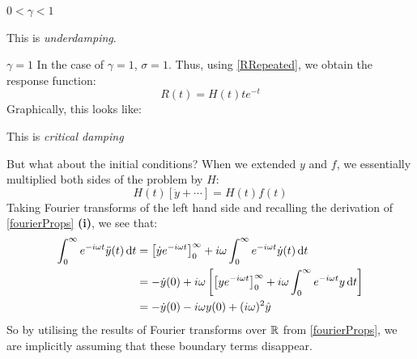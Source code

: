 \documentclass[../main.tex]{subfiles}
\begin{document}
\begin{example}
\begin{proofcases}
\begin{case}{$0 < \gamma < 1$}
\begin{center}
      \end{center}
      This is \textit{underdamping}.
    \end{case}
    \begin{case}{$\gamma = 1$}
      In the case of $\gamma = 1$, $\sigma = 1$.
      Thus, using \cref{RRepeated}, we obtain the response function:
      \[
        R(t) = H(t) t e^{-t}
      \]
      Graphically, this looks like:
      \begin{center}
      \end{center}
      This is \textit{critical damping}
    \end{case}
  \end{proofcases}
  But what about the initial conditions?
  When we extended $y$ and $f$, we essentially multiplied both sides of the problem by $H$:
  \[
    H(t) [\ddot{y} + \cdots] = H(t) f(t)
  \]
  Taking Fourier transforms of the left hand side and recalling the derivation of \cref{fourierProps} \textbf{(i)}, we see that:
  \begin{align*}
    \int_{0}^{\infty} e^{-i\omega t} \ddot{y}(t) \d{t} &= \eval{\dot{y} e^{-i\omega t}}{0}{\infty} + i\omega \int_{0}^{\infty} e^{-i\omega t} \dot{y}(t) \d{t} \\
                                                       &= -\dot{y}(0) + i\omega\left[\eval{ye^{-i\omega t}}{0}{\infty} + i\omega \int_{0}^{\infty} e^{-i\omega t} y \d{t}\right] \\
                                                       &= -\dot{y}(0) - i\omega y(0) + (i\omega)^2 \hat{y}
  \end{align*}
  So by utilising the results of Fourier transforms over $\mathbb{R}$ from \cref{fourierProps}, we are implicitly assuming that these boundary terms disappear.
\end{example}
\end{document}
